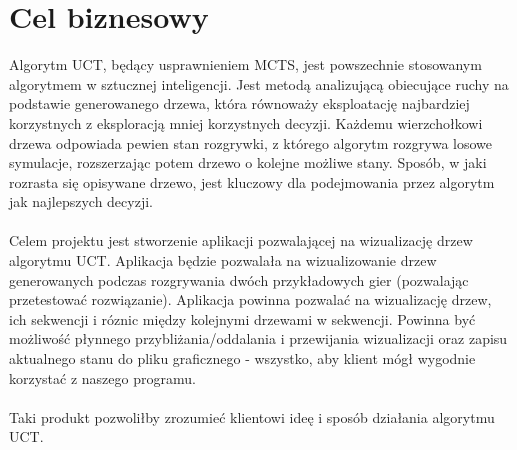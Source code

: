 \documentclass{article}
\let\oldsection\section
\renewcommand\section{\clearpage\oldsection}
\begin{document}
	\oldsection{Cel biznesowy}
	Algorytm UCT, będący usprawnieniem MCTS, jest powszechnie stosowanym algorytmem w sztucznej inteligencji. Jest metodą analizującą obiecujące ruchy na podstawie generowanego drzewa, która równoważy eksploatację najbardziej korzystnych z eksploracją mniej korzystnych decyzji. Każdemu wierzchołkowi drzewa odpowiada pewien stan rozgrywki, z którego algorytm rozgrywa losowe symulacje, rozszerzając potem drzewo o kolejne możliwe stany. Sposób, w jaki rozrasta się opisywane drzewo, jest kluczowy dla podejmowania przez algorytm jak najlepszych decyzji.\\\\
	\noindent Celem projektu jest stworzenie aplikacji pozwalającej na wizualizację drzew algorytmu UCT. Aplikacja będzie pozwalała na wizualizowanie drzew generowanych podczas rozgrywania dwóch przykładowych gier (pozwalając przetestować rozwiązanie). Aplikacja powinna pozwalać na wizualizację drzew, ich sekwencji i róznic między kolejnymi drzewami w sekwencji. Powinna być możliwość płynnego przybliżania/oddalania i przewijania wizualizacji oraz zapisu aktualnego stanu do pliku graficznego - wszystko, aby klient mógł wygodnie korzystać z naszego programu.\\\\
	Taki produkt pozwoliłby zrozumieć klientowi ideę i sposób działania algorytmu UCT.
	

	
	
\end{document}
